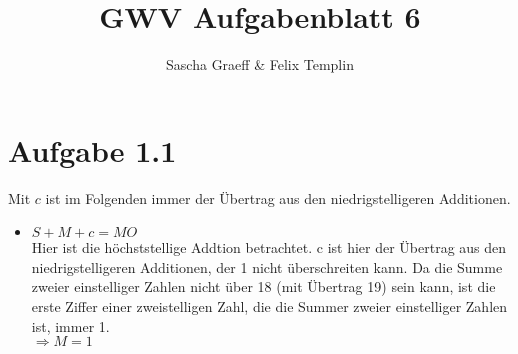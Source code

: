 \documentclass[a4paper,10pt]{article}
\title{GWV Aufgabenblatt 6}
\author{Sascha Graeff \& Felix Templin}
\begin{document}
\maketitle

\section*{Aufgabe 1.1}
Mit $c$ ist im Folgenden immer der Übertrag aus den niedrigstelligeren Additionen.
\begin{itemize}
  \item $S + M + c = MO$ \\
          Hier ist die höchststellige Addtion betrachtet. c ist hier der Übertrag aus den niedrigstelligeren Additionen, der 1 nicht überschreiten kann.
          Da die Summe zweier einstelliger Zahlen nicht über 18 (mit Übertrag 19) sein kann, ist die erste Ziffer einer zweistelligen Zahl, die die Summer zweier einstelliger Zahlen ist, immer 1. \\
          $\Rightarrow M = 1$
\end{itemize}
\end{document}
